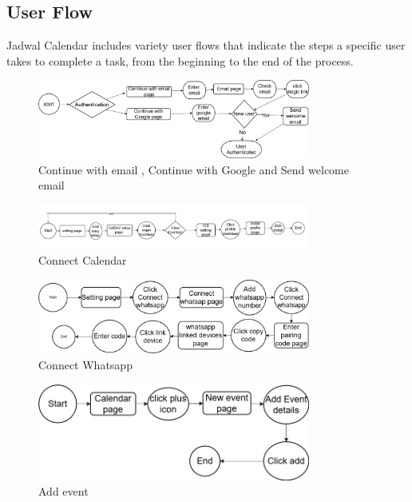 \subsection{User Flow}
Jadwal Calendar includes variety user flows that indicate the steps a specific user takes to complete a task, from the beginning to the end of the process.


\begin{figure}[H]
    \centering
    \includegraphics[width=0.8\textwidth]{images/Login user flow.drawio.png}
    \caption{ Continue with email  ,  Continue with Google
    and Send welcome email
      }
    \label{fig:login-user-flow}
\end{figure}


\begin{figure}[H]
    \centering
    \includegraphics[width=0.8\textwidth]{images/add jadwal calendar to ios calendar account.png}
    \caption{Connect Calendar }
    \label{fig:architecture-realization}
\end{figure}


\begin{figure}[H]
    \centering
    \includegraphics[width=0.8\textwidth]{images/connect whatsap.drawio.png}
    \caption{Connect Whatsapp  }
    \label{fig:architecture-realization}
\end{figure}


\begin{figure}[H]
    \centering
    \includegraphics[width=0.8\textwidth]{images/add event.drawio.png}
    \caption{Add event  }
    \label{fig:architecture-realization}
\end{figure}


